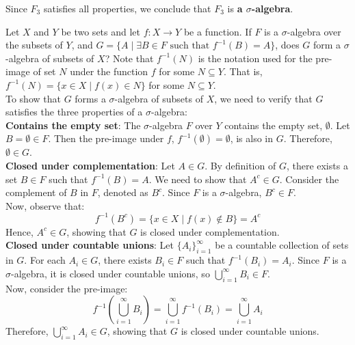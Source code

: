 \begin{example}
Since \(F_3\) satisfies all properties, we conclude that \(F_3\) is \textbf{a \(\sigma\)-algebra}.\\

\end{example}

\begin{example}
    Let \( X \) and \( Y \) be two sets and let \( f: X \rightarrow Y \) be a function. If \( F \) is a \(\sigma\)-algebra over the subsets of \( Y \), and \( G = \{ A \mid \exists B \in F \text{ such that } f^{-1}(B) = A \} \), does \( G \) form a \(\sigma\)-algebra of subsets of \( X \)?  Note that \( f^{-1}(N) \) is the notation used for the pre-image of set \( N \) under the function \( f \) for some \( N \subseteq Y \). That is, \( f^{-1}(N) = \{x \in X \mid f(x) \in N\} \) for some \( N \subseteq Y \).\\

    To show that \( G \) forms a \(\sigma\)-algebra of subsets of \( X \), we need to verify that \( G \) satisfies the three properties of a \(\sigma\)-algebra:\\

\textbf{Contains the empty set}:  The \(\sigma\)-algebra \( F \) over \( Y \) contains the empty set, \( \emptyset \). Let \( B = \emptyset \in F \). Then the pre-image under \( f \), \( f^{-1}(\emptyset) = \emptyset \), is also in \( G \). Therefore, \( \emptyset \in G \).\\

\textbf{Closed under complementation}:  Let \( A \in G \). By definition of \( G \), there exists a set \( B \in F \) such that \( f^{-1}(B) = A \). We need to show that \( A^c \in G \). Consider the complement of \( B \) in \( F \), denoted as \( B^c \). Since \( F \) is a \(\sigma\)-algebra, \( B^c \in F \).  \\

    Now, observe that:
    \[
    f^{-1}(B^c) = \{x \in X \mid f(x) \notin B\} = A^c
    \]
    Hence, \( A^c \in G \), showing that \( G \) is closed under complementation.\\

    \textbf{Closed under countable unions}: Let \( \{A_i\}_{i=1}^{\infty} \) be a countable collection of sets in \( G \). For each \( A_i \in G \), there exists \( B_i \in F \) such that \( f^{-1}(B_i) = A_i \). Since \( F \) is a \(\sigma\)-algebra, it is closed under countable unions, so \( \bigcup_{i=1}^{\infty} B_i \in F \). \\

    Now, consider the pre-image:
    \[
    f^{-1}\left(\bigcup_{i=1}^{\infty} B_i\right) = \bigcup_{i=1}^{\infty} f^{-1}(B_i) = \bigcup_{i=1}^{\infty} A_i
    \]
    Therefore, \( \bigcup_{i=1}^{\infty} A_i \in G \), showing that \( G \) is closed under countable unions.

\end{example}

